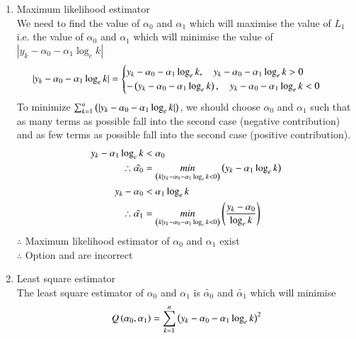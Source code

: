 \documentclass[journal,12pt,onecolumn]{IEEEtran}
\theoremstyle{remark}
\begin{document}
\begin{enumerate}
	\item Maximum likelihood estimator\\
	We need to find the value of $\alpha_{0}$ and $\alpha_{1}$ which will maximise the value of $L_{1}$ i.e. the value of 
	$\alpha_{0}$ and $\alpha_{1}$ which will minimise the value of $|y_{k}-\alpha_{0}-\alpha_{1} \log_{e}k|$
	\begin{align}
		|y_{k}-\alpha_{0}-\alpha_{1} \log_{e}k| &=
		\begin{cases}
		y_{k}-\alpha_{0}-\alpha_{1} \log_{e}k ,\quad y_{k}-\alpha_{0}-\alpha_{1} \log_{e}k > 0
			\\
		-\left(y_{k}-\alpha_{0}-\alpha_{1} \log_{e}k\right) ,\quad y_{k}-\alpha_{0}-\alpha_{1} \log_{e}k < 0
		\end{cases}
	\end{align}
	To minimize $\sum_{k = 1}^{n} \left(|y_{k}-\alpha_{0}-\alpha_{1} \log_{e}k|\right)$, 
	we should choose $\alpha_{0}$ and $\alpha_{1}$ such that as many terms as possible fall into the second case
	(negative contribution) and as few terms as possible fall into the second case (positive contribution).
	\begin{align}
		y_{k} -\alpha_{1} \log_{e}k &< \alpha_{0} \\%
		\therefore \tilde{\alpha_{0}} &= \underset{\brak{k|y_{k} - \alpha_{0}-\alpha_{1}\log_{e}k < 0}}{min} \brak{y_{k} - \alpha_{1}\log_{e}k}\\
		y_{k} - \alpha_{0} &< \alpha_{1} \log_{e}k \\%
		\therefore \tilde{\alpha_{1}} &= \underset{\brak{k|y_{k} -\alpha_{0} -\alpha_{1}\log_{e}k < 0}}{min} \brak{\frac{y_{k} - \alpha_{0}}{\log_{e}k}}\\
	\end{align}
$\therefore$ Maximum likelihood estimator of $\alpha_{0}$ and $\alpha_{1}$ exist\\
$\therefore$ Option  and  are incorrect\\
\item Least square estimator\\
The least square estimator of $\alpha_{0}$ and $\alpha_{1}$ is $\tilde{\alpha_{0}}$ and $\tilde{\alpha_{1}}$ which will minimise
\begin{align}
	Q\brak{\alpha_{0},\alpha_{1}} &=  \sum_{k = 1}^{n} \brak{y_{k}-\alpha_{0}-\alpha_{1} \log_{e}k}^2\\

\end{align}
\end{enumerate}
\end{document}
